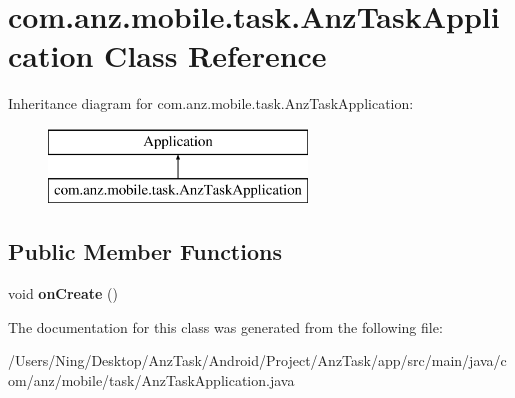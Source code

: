 \hypertarget{classcom_1_1anz_1_1mobile_1_1task_1_1_anz_task_application}{\section{com.\+anz.\+mobile.\+task.\+Anz\+Task\+Application Class Reference}
\label{classcom_1_1anz_1_1mobile_1_1task_1_1_anz_task_application}
}
Inheritance diagram for com.\+anz.\+mobile.\+task.\+Anz\+Task\+Application\+:\begin{figure}[H]
\begin{center}
\leavevmode
\includegraphics[height=2.000000cm]{classcom_1_1anz_1_1mobile_1_1task_1_1_anz_task_application}
\end{center}
\end{figure}
\subsection*{Public Member Functions}
\begin{DoxyCompactItemize}
\item 
\hypertarget{classcom_1_1anz_1_1mobile_1_1task_1_1_anz_task_application_a162b6099a5b53bf44590cf6c2f83e041}{void {\bfseries on\+Create} ()}\label{classcom_1_1anz_1_1mobile_1_1task_1_1_anz_task_application_a162b6099a5b53bf44590cf6c2f83e041}

\end{DoxyCompactItemize}


The documentation for this class was generated from the following file\+:\begin{DoxyCompactItemize}
\item 
/\+Users/\+Ning/\+Desktop/\+Anz\+Task/\+Android/\+Project/\+Anz\+Task/app/src/main/java/com/anz/mobile/task/Anz\+Task\+Application.\+java\end{DoxyCompactItemize}
